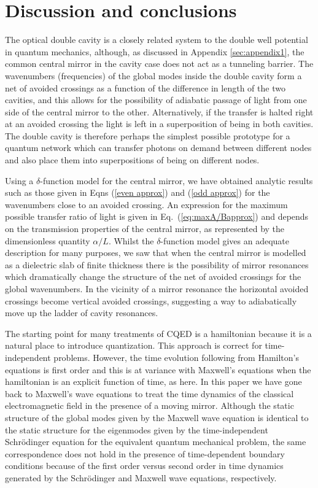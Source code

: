\documentclass[twocolumn,english,pra,aps,superscriptaddress,floatfix]{revtex4-1}
\begin{document}
\section{Discussion and conclusions}
\label{sec:conclusion}

The optical double cavity is a closely related system to the double well potential in quantum mechanics, although, as discussed in Appendix \ref{sec:appendix1}, the common central mirror in the cavity case does not act as a tunneling barrier. The  wavenumbers (frequencies) of the global modes inside the double cavity form a net of avoided crossings as a function of the difference in length of the two cavities, and this allows for the possibility of adiabatic passage of light from one side of the central mirror to the other. Alternatively, if the transfer is halted right at an avoided crossing the light is left in a superposition of being in both cavities. The double cavity is therefore perhaps the simplest possible prototype for a quantum network which can transfer photons on demand between different nodes and also place them into superpositions of being on different nodes.

Using a $\delta$-function model for the central mirror, we have obtained analytic results such as those given in Eqns (\ref{even approx}) and (\ref{odd approx}) for the wavenumbers close to an avoided crossing.
An expression for the maximum possible transfer ratio of light is given in Eq.\ (\ref{eq:maxA/Bapprox}) and depends on the transmission properties of the central mirror, as represented by the dimensionless quantity $\alpha/L$. Whilst the $\delta$-function model gives an adequate description for many purposes, we saw that when the central mirror is modelled as a dielectric slab of finite thickness there is the possibility of mirror resonances which dramatically change the structure of the net of avoided crossings for the global wavenumbers. In the vicinity of a mirror resonance the horizontal avoided crossings become vertical avoided crossings, suggesting a way to adiabatically move up the ladder of cavity resonances.

The starting point for many treatments of CQED is a hamiltonian because it is a natural place to introduce quantization. This approach is correct for time-independent problems. However, the time evolution following from Hamilton's equations is first order and this is at variance with Maxwell's equations when the hamiltonian is an explicit function of time, as here. In this paper we have gone back to Maxwell's wave equations to treat the time dynamics of the classical electromagnetic field in the presence of a moving mirror. Although the static structure of the global modes given by the Maxwell wave equation is identical to the static structure for the eigenmodes given by the time-independent Schr\"{o}dinger equation for the equivalent quantum mechanical problem,  the same correspondence does not  hold in the presence of time-dependent boundary conditions because of the first order versus second order in time dynamics generated by the Schr\"{o}dinger and Maxwell wave equations, respectively. 
\end{document}
